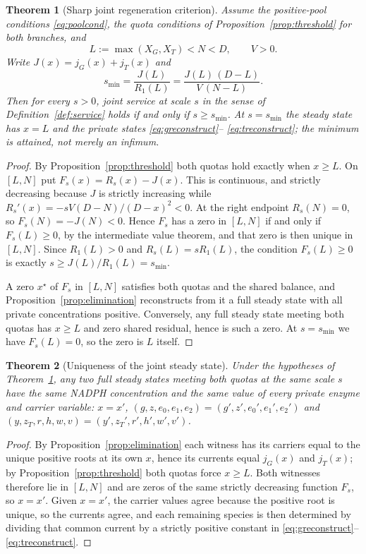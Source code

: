 \documentclass[11pt,a4paper]{article}
\theoremstyle{plain}
\newtheorem{theorem}{Theorem}[section]
\theoremstyle{definition}
\theoremstyle{remark}
\begin{document}
\begin{theorem}[Sharp joint regeneration criterion]\label{thm:main}
Assume the positive-pool conditions \eqref{eq:poolcond}, the quota conditions of
Proposition~\ref{prop:threshold} for both branches, and
\[
  L:=\max(X_G,X_T)<N<D,\qquad V>0 .
\]
Write $J(x)=j_G(x)+j_T(x)$ and
\begin{equation}\label{eq:smin}
  s_{\min}=\frac{J(L)}{R_1(L)}=\frac{J(L)\,(D-L)}{V\,(N-L)} .
\end{equation}
Then for every $s>0$, joint service at scale $s$ in the sense of
Definition~\ref{def:service} holds if and only if $s\ge s_{\min}$. At $s=s_{\min}$
the steady state has $x=L$ and the private states \eqref{eq:greconstruct}--%
\eqref{eq:treconstruct}; the minimum is attained, not merely an infimum.
\end{theorem}

\begin{proof}
By Proposition~\ref{prop:threshold} both quotas hold exactly when $x\ge L$. On
$[L,N]$ put $F_s(x)=R_s(x)-J(x)$. This is continuous, and strictly decreasing
because $J$ is strictly increasing while
$R_s'(x)=-sV(D-N)/(D-x)^2<0$. At the right endpoint $R_s(N)=0$, so
$F_s(N)=-J(N)<0$. Hence $F_s$ has a zero in $[L,N]$ if and only if $F_s(L)\ge0$,
by the intermediate value theorem, and that zero is then unique in $[L,N]$.
Since $R_1(L)>0$ and $R_s(L)=sR_1(L)$, the condition $F_s(L)\ge0$ is exactly
$s\ge J(L)/R_1(L)=s_{\min}$.

A zero $x^\star$ of $F_s$ in $[L,N]$ satisfies both quotas and the shared balance,
and Proposition~\ref{prop:elimination} reconstructs from it a full steady state
with all private concentrations positive. Conversely, any full steady state
meeting both quotas has $x\ge L$ and zero shared residual, hence is such a zero.
At $s=s_{\min}$ we have $F_s(L)=0$, so the zero is $L$ itself.
\end{proof}

\begin{theorem}[Uniqueness of the joint steady state]\label{thm:unique}
Under the hypotheses of Theorem~\ref{thm:main}, any two full steady states meeting
both quotas at the same scale $s$ have the same NADPH concentration and the same
value of every private enzyme and carrier variable:
$x=x'$, $(g,z,e_0,e_1,e_2)=(g',z',e_0',e_1',e_2')$ and
$(y,z_T,r,h,w,v)=(y',z_T',r',h',w',v')$.
\end{theorem}

\begin{proof}
By Proposition~\ref{prop:elimination} each witness has its carriers equal to the
unique positive roots at its own $x$, hence its currents equal $j_G(x)$ and
$j_T(x)$; by Proposition~\ref{prop:threshold} both quotas force $x\ge L$. Both
witnesses therefore lie in $[L,N]$ and are zeros of the same strictly decreasing
function $F_s$, so $x=x'$. Given $x=x'$, the carrier values agree because the
positive root is unique, so the currents agree, and each remaining species is
then determined by dividing that common current by a strictly positive constant
in \eqref{eq:greconstruct}--\eqref{eq:treconstruct}.
\end{proof}
\end{document}
